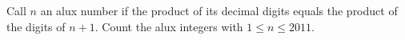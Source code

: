 Call $n$ an alux number if the product of its decimal digits equals the product of the digits of $n+1$. Count the alux integers with $1\le n\le2011$.
